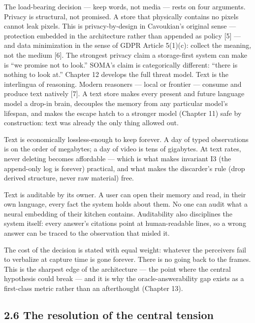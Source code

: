 The load-bearing decision --- keep words, not media --- rests on four arguments. Privacy is structural, not promised. A store that physically contains no pixels cannot leak pixels. This is privacy-by-design in Cavoukian's original sense --- protection embedded in the architecture rather than appended as policy {[}5{]} --- and data minimization in the sense of GDPR Article 5(1)(c): collect the meaning, not the medium {[}6{]}. The strongest privacy claim a storage-first system can make is ``we promise not to look.'' SOMA's claim is categorically different: ``there is nothing to look at.'' Chapter 12 develops the full threat model. Text is the interlingua of reasoning. Modern reasoners --- local or frontier --- consume and produce text natively {[}7{]}. A text store makes every present and future language model a drop-in brain, decouples the memory from any particular model's lifespan, and makes the escape hatch to a stronger model (Chapter 11) safe by construction: text was already the only thing allowed out.

Text is economically lossless-enough to keep forever. A day of typed observations is on the order of megabytes; a day of video is tens of gigabytes. At text rates, never deleting becomes affordable --- which is what makes invariant I3 (the append-only log is forever) practical, and what makes the discarder's rule (drop derived structure, never raw material) free.

Text is auditable by its owner. A user can open their memory and read, in their own language, every fact the system holds about them. No one can audit what a neural embedding of their kitchen contains. Auditability also disciplines the system itself: every answer's citations point at human-readable lines, so a wrong answer can be traced to the observation that misled it.

The cost of the decision is stated with equal weight: whatever the perceivers fail to verbalize at capture time is gone forever. There is no going back to the frames. This is the sharpest edge of the architecture --- the point where the central hypothesis could break --- and it is why the oracle-answerability gap exists as a first-class metric rather than an afterthought (Chapter 13).

\subsection{2.6 The resolution of the central tension}\label{the-resolution-of-the-central-tension}

